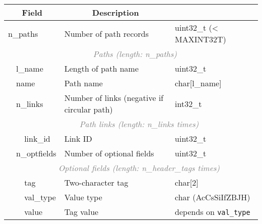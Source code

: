 \documentclass[12pt]{article}
\begin{document}
\begin{tabular}{|ll|>{\sffamily}l|p{6.5cm}|>{\ttfamily}l|}
\hline
\multicolumn{3}{|c|}{\textbf{Field}} &
\multicolumn{1}{c|}{\textbf{Description}} &
\multicolumn{1}{c|}{\textbf{Type}} \\
\hline
\multicolumn{3}{|l|}{\sf n\_paths}
& Number of path records & uint32\_t (< MAXINT32T) \\
\hline
\multicolumn{1}{|l}{} &
\multicolumn{4}{c|}{\textcolor{gray}{\textit{Paths (length: n\_paths)}}}\\
\cline{2-5}
& \multicolumn{2}{|l|}{\sf l\_name} & Length of path name & uint32\_t \\
\cline{2-5}
& \multicolumn{2}{|l|}{\sf name} & Path name & char[l\_name] \\
\cline{2-5}
& \multicolumn{2}{|l|}{\sf n\_links}
& Number of links (negative if circular path) & int32\_t \\
\cline{2-5}
\multicolumn{2}{|l}{} &
\multicolumn{3}{c|}{\textcolor{gray}{\textit{Path links
(length: n\_links times)}}}\\
\cline{3-5}
& & link\_id & Link ID & uint32\_t \\
\cline{2-5}
& \multicolumn{2}{|l|}{\sf n\_optfields}
  & Number of optional fields & uint32\_t \\
\cline{2-5}
\multicolumn{2}{|l}{} &
\multicolumn{3}{c|}{\textcolor{gray}{\textit{Optional fields
(length: n\_header\_tags times)}}}\\
\cline{3-5}
& & tag & Two-character tag & char[2] \\
\cline{3-5}
& & val\_type & Value type & char (AcCsSiIfZBJH) \\
\cline{3-5}
& & value & Tag value &
depends on {\tt val\_type} \\
\hline
\end{tabular}
\end{document}
